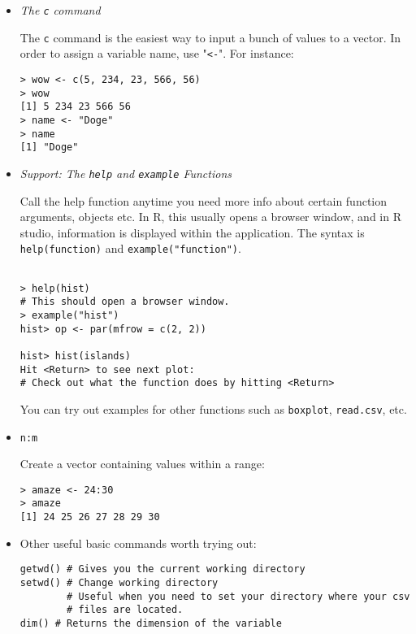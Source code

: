 \documentclass[12pt]{article}
\begin{document}
\begin{itemize}

\item \emph{The \texttt{c} command}

The \texttt{c} command is the easiest way to input a bunch of values to a vector.
In order to assign a variable name, use "\texttt{<-}". For instance:

\begin{verbatim}
> wow <- c(5, 234, 23, 566, 56)
> wow
[1] 5 234 23 566 56
> name <- "Doge"
> name
[1] "Doge"
\end{verbatim}


\item \emph{Support: The \texttt{help} and \texttt{example} Functions}

Call the help function anytime you need more info about certain function arguments,
objects etc. In R, this usually opens a browser window, and in R studio,
information is displayed within the application. The syntax is \texttt{help(function)}
and \texttt{example("function")}.

\begin{verbatim}

> help(hist)
# This should open a browser window.
> example("hist")
hist> op <- par(mfrow = c(2, 2))

hist> hist(islands)
Hit <Return> to see next plot:
# Check out what the function does by hitting <Return>
\end{verbatim}
You can try out examples for other functions such as \texttt{boxplot}, \texttt{read.csv}, etc.

\item \texttt{n:m}

Create a vector containing values within a range:

\begin{verbatim}
> amaze <- 24:30
> amaze
[1] 24 25 26 27 28 29 30
\end{verbatim}

\item Other useful basic commands worth trying out:
\begin{verbatim}
getwd() # Gives you the current working directory
setwd() # Change working directory
        # Useful when you need to set your directory where your csv
        # files are located.
dim() # Returns the dimension of the variable
\end{verbatim}
\end{itemize}
\end{document}
